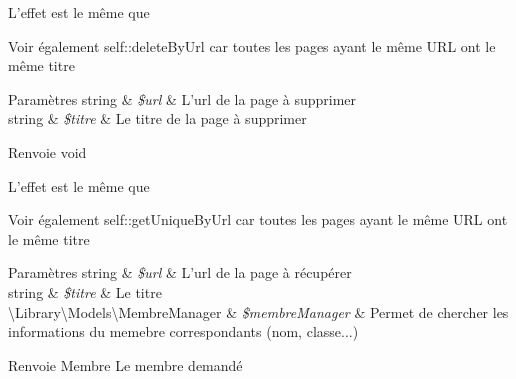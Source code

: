 
\begin{DoxyRefList}
\item[\label{deprecated__deprecated000001}%
\hypertarget{deprecated__deprecated000001}{}%
Global(e) \hyperlink{class_library_1_1_models_1_1_page_archivable_manager_a3bf67f20497b82d53f6ed33439c6eff2}{Page\+Archivable\+Manager\+:\+:delete\+By\+Url\+And\+Titre} (\$url, \$titre)]L'effet est le même que \begin{DoxySeeAlso}{Voir également}
self\+::delete\+By\+Url car toutes les pages ayant le même U\+R\+L ont le même titre 
\end{DoxySeeAlso}

\begin{DoxyParams}[1]{Paramètres}
string & {\em \$url} & L'url de la page à supprimer \\
\hline
string & {\em \$titre} & Le titre de la page à supprimer \\
\hline
\end{DoxyParams}
\begin{DoxyReturn}{Renvoie}
void  
\end{DoxyReturn}

\item[\label{deprecated__deprecated000002}%
\hypertarget{deprecated__deprecated000002}{}%
Global(e) \hyperlink{class_library_1_1_models_1_1_page_archivable_manager_a968054a64e44b15546a87f57a5c5ba03}{Page\+Archivable\+Manager\+:\+:get\+Unique\+By\+Url\+And\+Titre} (\$url, \$titre, \$membre\+Manager=null)]L'effet est le même que \begin{DoxySeeAlso}{Voir également}
self\+::get\+Unique\+By\+Url car toutes les pages ayant le même U\+R\+L ont le même titre 
\end{DoxySeeAlso}

\begin{DoxyParams}[1]{Paramètres}
string & {\em \$url} & L'url de la page à récupérer \\
\hline
string & {\em \$titre} & Le titre \\
\hline
\textbackslash{}\+Library\textbackslash{}\+Models\textbackslash{}\+Membre\+Manager & {\em \$membre\+Manager} & Permet de chercher les informations du memebre correspondants (nom, classe...) \\
\hline
\end{DoxyParams}
\begin{DoxyReturn}{Renvoie}
Membre Le membre demandé 
\end{DoxyReturn}

\end{DoxyRefList}